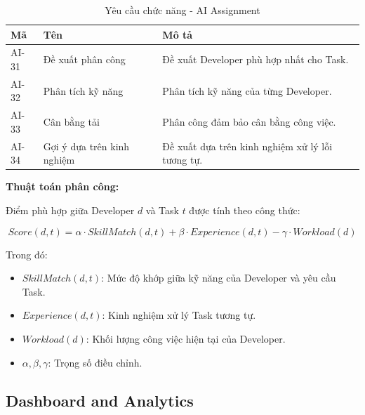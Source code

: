 \documentclass[12pt,a4paper]{report}
\begin{document}
\begin{table}[H]
\centering
\caption{Yêu cầu chức năng - AI Assignment}
\begin{tabular}{|p{2.5cm}|p{3.5cm}|p{8cm}|}
\hline
\textbf{Mã} & \textbf{Tên} & \textbf{Mô tả} \\
\hline
AI-31 & Đề xuất phân công & Đề xuất Developer phù hợp nhất cho Task. \\
\hline
AI-32 & Phân tích kỹ năng & Phân tích kỹ năng của từng Developer. \\
\hline
AI-33 & Cân bằng tải & Phân công đảm bảo cân bằng công việc. \\
\hline
AI-34 & Gợi ý dựa trên kinh nghiệm & Đề xuất dựa trên kinh nghiệm xử lý lỗi tương tự. \\
\hline
\end{tabular}
\label{tab:ai_assignment_requirements}
\end{table}

\textbf{Thuật toán phân công:}

Điểm phù hợp giữa Developer \(d\) và Task \(t\) được tính theo công thức:

\[
Score(d,t) = \alpha \cdot SkillMatch(d,t) + \beta \cdot Experience(d,t) - \gamma \cdot Workload(d)
\]

Trong đó:
\begin{itemize}
\item \(SkillMatch(d,t)\): Mức độ khớp giữa kỹ năng của Developer và yêu cầu Task.
\item \(Experience(d,t)\): Kinh nghiệm xử lý Task tương tự.
\item \(Workload(d)\): Khối lượng công việc hiện tại của Developer.
\item \(\alpha, \beta, \gamma\): Trọng số điều chỉnh.
\end{itemize}

\subsection{Dashboard and Analytics}
\end{document}
